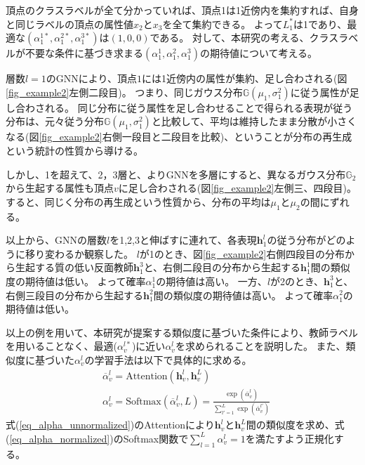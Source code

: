 \documentclass[a4j,twocolumn]{jsarticle}
\begin{document}
\vspace{-2mm}
頂点のクラスラベルが全て分かっていれば、頂点1は1近傍内を集約すれば、自身と同じラベルの頂点の属性値$x_2$と$x_3$を全て集約できる。
よって$L_1^*$は1であり、最適な$(\alpha_1^{1*},\alpha_1^{2*},\alpha_1^{3*})$は$(1,0,0)$である。
対して、本研究の考える、クラスラベルが不要な条件に基づき求まる$(\alpha_1^1,\alpha_1^2,\alpha_1^3)$の期待値について考える。

層数$l=1$のGNNにより、頂点$1$には1近傍内の属性が集約、足し合わされる(図\ref{fig_example2}左側二段目)。
つまり、同じガウス分布$\mathbb{G}(\mu_1, \sigma_1^2)$に従う属性が足し合わされる。
同じ分布に従う属性を足し合わせることで得られる表現が従う分布は、元々従う分布$\mathbb{G}(\mu_1, \sigma_1^2)$と比較して、平均は維持したまま分散が小さくなる(図\ref{fig_example2}右側一段目と二段目を比較)、ということが分布の再生成という統計の性質から導ける。

しかし、1を超えて、2，3層と、よりGNNを多層にすると、異なるガウス分布$\mathbb{G}_2$から生起する属性も頂点$v$に足し合わされる(図\ref{fig_example2}左側三、四段目)。
すると、同じく分布の再生成という性質から、分布の平均は$\mu_1$と$\mu_2$の間にずれる。

以上から、GNNの層数$l$を1,2,3と伸ばすに連れて、各表現$\bm{h}_1^l$の従う分布がどのように移り変わるか観察した。
$l$が1のとき、図\ref{fig_example2}右側四段目の分布から生起する質の低い反面教師$\bm{h}_1^3$と、右側二段目の分布から生起する$\bm{h}_1^1$間の類似度の期待値は低い。
よって確率$\alpha_1^1$の期待値は高い。
一方、$l$が2のとき、$\bm{h}_1^3$と、右側三段目の分布から生起する$\bm{h}_1^2$間の類似度の期待値は高い。
よって確率$\alpha_1^2$の期待値は低い。

以上の例を用いて、本研究が提案する類似度に基づいた条件により、教師ラベルを用いることなく、最適($\alpha_v^{l*}$)に近い$\alpha_v^l$を求められることを説明した。
また、類似度に基づいた$\alpha_v^l$の学習手法は以下で具体的に求める。
\begin{align}
  & \overline{\alpha}_v^l = \text{Attention}(\bm{h}_v^l, \bm{h}_v^L) \label{eq_alpha_unnormalized} \\
  & \alpha_v^l = \text{Softmax}(\overline{\alpha}_v^l, L) = \frac{\exp(\overline{\alpha}_v^l)}{\sum_{l'=1}^L \exp(\overline{\alpha}_v^{l'})} \label{eq_alpha_normalized}
\end{align}
式(\ref{eq_alpha_unnormalized})のAttention\cite{Vaswani}により$\bm{h}_v^l$と$\bm{h}_v^L$間の類似度を求め、式(\ref{eq_alpha_normalized})のSoftmax関数で$\sum_{l=1}^L \alpha_v^l=1$を満たすよう正規化する。
\end{document}
